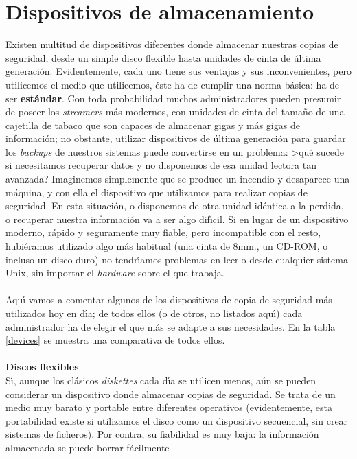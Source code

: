 \section{Dispositivos de almacenamiento}
Existen multitud de dispositivos diferentes donde almacenar nuestras copias de
seguridad, desde un simple disco flexible hasta unidades de cinta de \'ultima
generaci\'on. Evidentemente, cada uno tiene sus ventajas y sus inconvenientes,
pero utilicemos el medio que utilicemos, \'este ha de cumplir una norma
b\'asica: ha de ser {\bf est\'andar}. Con toda probabilidad muchos 
administradores pueden presumir de poseer los {\it streamers} m\'as modernos,
con unidades de cinta del tama\~no de una cajetilla de tabaco que son capaces
de almacenar gigas y m\'as gigas de informaci\'on; no obstante, utilizar 
dispositivos de \'ultima generaci\'on para guardar los {\it backups} de nuestros
sistemas puede convertirse en un problema: >qu\'e sucede si necesitamos 
recuperar datos y no disponemos de esa unidad lectora tan avanzada? Imaginemos
simplemente que se produce un incendio y desaparece una m\'aquina, y con ella
el dispositivo que utilizamos para realizar copias de seguridad. En esta 
situaci\'on, o disponemos de otra unidad id\'entica a la perdida, o recuperar
nuestra informaci\'on va a ser algo dif\'{\i}cil. Si en lugar de un dispositivo
moderno, r\'apido y seguramente muy fiable, pero incompatible con el resto,
hubi\'eramos utilizado algo m\'as habitual (una cinta de 8mm., un CD-ROM, o 
incluso un disco duro) no tendr\'{\i}amos problemas en leerlo desde cualquier
sistema Unix, sin importar el {\it hardware} sobre el que trabaja.\\
\\Aqu\'{\i} vamos a comentar algunos de los dispositivos de copia de seguridad
m\'as utilizados hoy en d\'{\i}a; de todos ellos (o de otros, no listados
aqu\'{\i}) cada administrador ha de elegir el que m\'as se adapte a sus 
necesidades. En la tabla \ref{devices} se muestra una comparativa de todos
ellos.\\
\\{\bf Discos flexibles}\\
S\'{\i}, aunque los cl\'asicos {\it diskettes} cada d\'{\i}a se utilicen menos,
a\'un se pueden considerar un dispositivo donde almacenar copias de seguridad.
Se trata de un medio muy barato y portable entre diferentes operativos 
(evidentemente, esta portabilidad existe si utilizamos el disco como un 
dispositivo secuencial, sin crear sistemas de ficheros). Por contra, su 
fiabilidad es muy baja: la informaci\'on almacenada se puede borrar f\'acilmente
